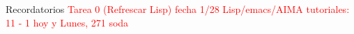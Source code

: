 \begin{frame}{Recordatorios}
    \textcolor{red}{Tarea 0 (Refrescar Lisp) fecha 1/28} \newline
    \textcolor{red}{Lisp/emacs/AIMA tutoriales: 11 - 1 hoy y Lunes, 271 soda}
\end{frame}